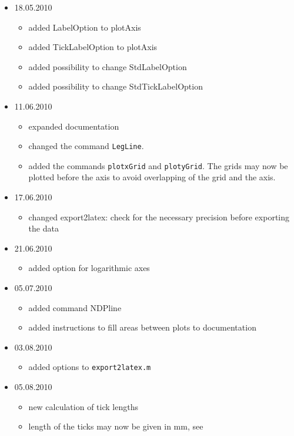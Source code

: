 \begin{itemize}
  \item 18.05.2010
  \begin{itemize}
    \item added LabelOption to plotAxis
    \item added TickLabelOption to plotAxis
    \item added possibility to change StdLabelOption
    \item added possibility to change StdTickLabelOption
  \end{itemize}
  \item 11.06.2010
  \begin{itemize}
    \item expanded documentation
    \item changed the command \texttt{LegLine}.
    \item added the commands \texttt{plotxGrid} and \texttt{plotyGrid}. The
    grids may now be plotted before the axis to avoid overlapping of the grid
    and the axis.
  \end{itemize}
  \item 17.06.2010
  \begin{itemize}
    \item changed export2latex: check for the necessary precision before
    exporting the data
  \end{itemize}
  \item 21.06.2010
  \begin{itemize}
    \item added option for logarithmic axes
  \end{itemize}
  \item 05.07.2010
  \begin{itemize}
    \item added command NDPline
    \item added instructions to fill areas between plots to documentation
  \end{itemize}
  \item 03.08.2010
  \begin{itemize}
    \item added options to \texttt{export2latex.m}
  \end{itemize}
  \item 05.08.2010
  \begin{itemize}
  	\item new calculation of tick lengths
  	\item length of the ticks may now be given in mm, see

\end{itemize}
\end{itemize}
